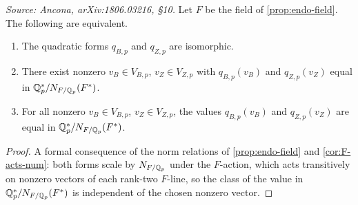 \begin{corollary}
  \label{cor:norm-criterion}
  \textit{Source: Ancona, arXiv:1806.03216, \S10.}
  Let \(F\) be the field of \cref{prop:endo-field}. The following are
  equivalent.
  \begin{enumerate}
    \item The quadratic forms \(q_{B,p}\) and \(q_{Z,p}\) are isomorphic.
    \item There exist nonzero \(v_B \in V_{B,p}\), \(v_Z \in V_{Z,p}\) with
      \(q_{B,p}(v_B)\) and \(q_{Z,p}(v_Z)\) equal in
      \(\mathbb{Q}_p^*/N_{F/\mathbb{Q}_p}(F^*)\).
    \item For all nonzero \(v_B \in V_{B,p}\), \(v_Z \in V_{Z,p}\), the values
      \(q_{B,p}(v_B)\) and \(q_{Z,p}(v_Z)\) are equal in
      \(\mathbb{Q}_p^*/N_{F/\mathbb{Q}_p}(F^*)\).
  \end{enumerate}
\end{corollary}

\begin{proof}
  A formal consequence of the norm relations of \cref{prop:endo-field} and
  \cref{cor:F-acts-num}: both forms
  scale by \(N_{F/\mathbb{Q}_p}\) under the \(F\)-action, which acts transitively on
  nonzero vectors of each rank-two \(F\)-line, so the class of the value in
  \(\mathbb{Q}_p^*/N_{F/\mathbb{Q}_p}(F^*)\) is independent of the chosen nonzero vector.
\end{proof}

